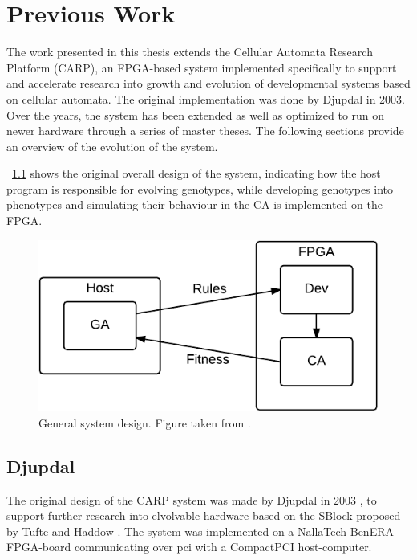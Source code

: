 
\chapter{Previous Work}

The work presented in this thesis extends the Cellular Automata Research
Platform (CARP), an FPGA-based system implemented specifically to support and
accelerate research into growth and evolution of developmental systems based on
cellular automata. The original implementation was done by Djupdal in 2003. Over
the years, the system has been extended as well as optimized to run on newer
hardware through a series of master theses. The following sections provide an
overview of the evolution of the system.

\figurename~\ref{fig:overview-general} shows the original overall design of the
system, indicating how the host program is responsible for evolving genotypes,
while developing genotypes into phenotypes and simulating their behaviour in the
CA is implemented on the FPGA.

\begin{figure}[ht]
  \centering
  \includegraphics[width=0.6\linewidth]{fig/overview-general}
  \caption[General system design]{General system design. Figure taken from \cite{Lundal2015a}.\label{fig:overview-general} }
\end{figure}

%

\section{Djupdal}

The original design of the CARP system was made by Djupdal in
2003 \cite{Djupdal2003}, to support further research into elvolvable hardware
based on the SBlock proposed by Tufte and Haddow \cite{Haddow2000a}.
The system was implemented on a NallaTech BenERA FPGA-board communicating over
\acrfull{pci} with a CompactPCI host-computer.

